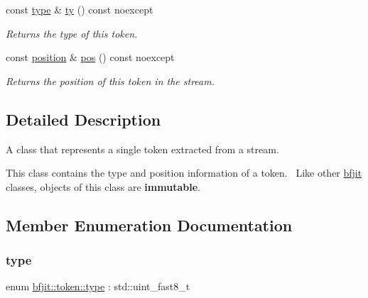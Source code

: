 \begin{DoxyCompactItemize}
\hypertarget{classbfjit_1_1token_a110492faa8b37b72a99aca257e584b9b}{}\label{classbfjit_1_1token_a110492faa8b37b72a99aca257e584b9b} 
const \hyperlink{classbfjit_1_1token_a2486a3e583fb48f3863c4eb5c32cdd96}{type} \& \hyperlink{classbfjit_1_1token_a110492faa8b37b72a99aca257e584b9b}{ty} () const noexcept
\begin{DoxyCompactList}\small\item\em Returns the type of this token. \end{DoxyCompactList}\item 
\hypertarget{classbfjit_1_1token_aaebe0e1d3ab07f029478e13f7497a213}{}\label{classbfjit_1_1token_aaebe0e1d3ab07f029478e13f7497a213} 
const \hyperlink{classbfjit_1_1position}{position} \& \hyperlink{classbfjit_1_1token_aaebe0e1d3ab07f029478e13f7497a213}{pos} () const noexcept
\begin{DoxyCompactList}\small\item\em Returns the position of this token in the stream. \end{DoxyCompactList}\end{DoxyCompactItemize}


\subsection{Detailed Description}
A class that represents a single token extracted from a stream. 

This class contains the type and position information of a token.~\newline
Like other \hyperlink{namespacebfjit}{bfjit} classes, objects of this class are {\bfseries immutable}. 

\subsection{Member Enumeration Documentation}
\hypertarget{classbfjit_1_1token_a2486a3e583fb48f3863c4eb5c32cdd96}{}\label{classbfjit_1_1token_a2486a3e583fb48f3863c4eb5c32cdd96} 
\subsubsection{\texorpdfstring{type}{type}}
{\footnotesize\ttfamily enum \hyperlink{classbfjit_1_1token_a2486a3e583fb48f3863c4eb5c32cdd96}{bfjit\+::token\+::type} \+: std\+::uint\+\_\+fast8\+\_\+t\hspace{0.3cm}{\ttfamily [strong]}}



